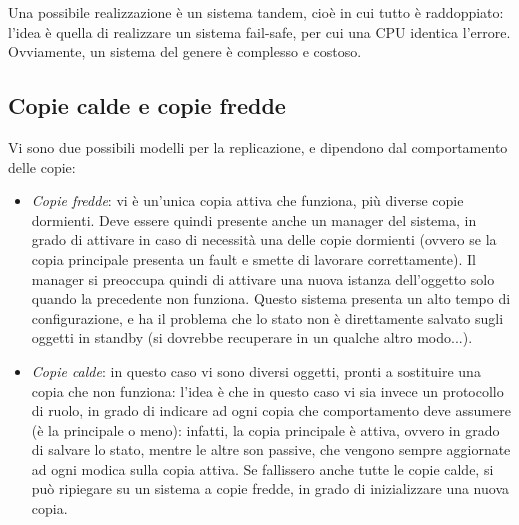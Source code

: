 Una possibile realizzazione è un sistema tandem, cioè in cui tutto è raddoppiato: l'idea è quella di realizzare un
sistema fail-safe, per cui una CPU identica l'errore. Ovviamente, un sistema del genere è complesso e costoso.
\subsection{Copie calde e copie fredde}
Vi sono due possibili modelli per la replicazione, e dipendono dal comportamento delle copie:
\begin{itemize}
 \item \textit{Copie fredde}: vi è un'unica copia attiva che funziona, più diverse copie dormienti. Deve essere quindi
 presente anche un manager del sistema, in grado di attivare in caso di necessità una delle copie dormienti (ovvero se
 la copia principale presenta un fault e smette di lavorare correttamente). Il manager si preoccupa quindi di attivare
 una nuova istanza dell'oggetto solo quando la precedente non funziona. Questo sistema presenta un alto tempo di
 configurazione, e ha il problema che lo stato non è direttamente salvato sugli oggetti in standby (si dovrebbe
 recuperare in un qualche altro modo...).
 \item \textit{Copie calde}: in questo caso vi sono diversi oggetti, pronti a sostituire una copia che non funziona:
 l'idea è che in questo caso vi sia invece un protocollo di ruolo, in grado di indicare ad ogni copia che comportamento
 deve assumere (è la principale o meno): infatti, la copia principale è attiva, ovvero in grado di salvare lo stato,
 mentre le altre son passive, che vengono sempre aggiornate ad ogni modica sulla copia attiva. Se fallissero anche 
 tutte le copie calde, si può ripiegare su un sistema a copie fredde, in grado di inizializzare una nuova copia.
\end{itemize}
